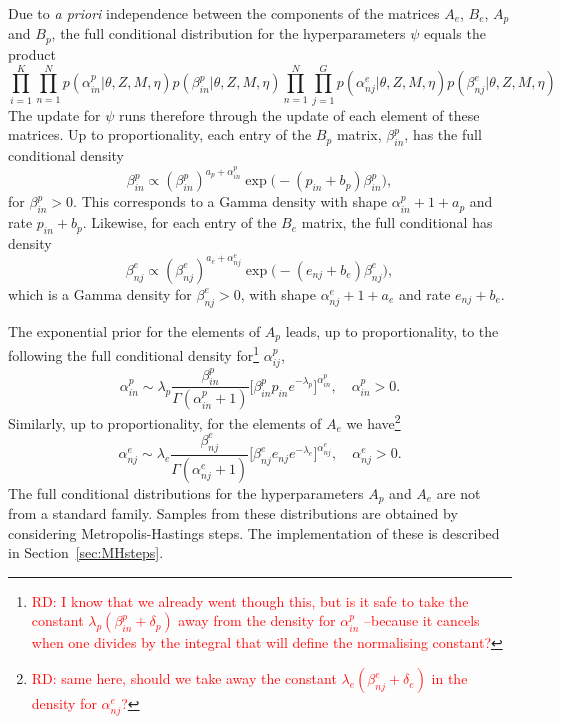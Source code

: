 \documentclass[11pt]{amsart}
\theoremstyle{definition}
\theoremstyle{remark}
\begin{document}
Due to \emph{a priori} independence between the
components of the matrices $A_e$, $B_e$, $A_p$ and $B_p$, the full conditional distribution for the hyperparameters $\psi$ equals the product
\[
   \prod_{i=1}^K\prod_{n=1}^N
     p(\alpha_{in}^p| \theta, Z, M, \eta)
     p(\beta_{in}^p|\theta, Z, M, \eta)
   \prod_{n=1}^N\prod_{j=1}^G
     p(\alpha_{nj}^e|\theta, Z, M, \eta)
     p(\beta_{nj}^e|\theta, Z, M, \eta)
\]
The update for $\psi$ runs therefore through the update of each
element of these matrices. Up to proportionality, each entry of the
$B_p$ matrix, $\beta_{in}^p$,  has the full conditional density
\begin{equation}
 \label{eqn:Full_for_Bp}
 \beta_{in}^p
   \propto
   (\beta_{in}^p)^{a_p + \alpha_{in}^p} 
   \exp\Big(-(p_{in}+b_p)\beta_{in}^p\Big),\tag{$s_4$}
\end{equation}
for $\beta_{in}^p > 0$. This corresponds to a Gamma density with shape
$\alpha_{in}^p + 1 + a_p$ and rate $p_{in} + b_p$.  Likewise, for each
entry of the $B_e$ matrix, the full conditional has density 
\begin{equation}
 \label{eqn:Full_for_Be}
 \beta_{nj}^e
   \propto
  (\beta_{nj}^e)^{a_e + \alpha_{nj}^e} 
  \exp\Big(-(e_{nj}+b_e)\beta_{nj}^e\Big),\tag{$s_5$}
\end{equation}
which is a  Gamma density for $\beta_{nj}^e > 0$, with shape
$\alpha_{nj}^e + 1+ a_e$ and rate $e_{nj}+b_e$. 


The exponential prior for the elements of $A_p$ leads, up to
proportionality, to the following the full conditional density
for\footnote{\textcolor{red}{RD: I know that we already went though
    this, but  is it safe to take the constant $\lambda_p(\beta_{in}^p
    + \delta_p)$ away from the density for $\alpha_{in}^p$ --because
    it  cancels when one divides by the integral that will define the
    normalising constant?}}
$\alpha_{ij}^p$,
\begin{equation}
 \label{eqn:Full_for_Ap}
  \alpha_{in}^p 
  \sim 
  \lambda_p\frac{\beta_{in}^p}{\Gamma(\alpha_{in}^p + 1)} 
   \Big[\beta_{in}^pp_{in}
   e^{-\lambda_p}\Big]^{\alpha_{in}^p}, \tag{$s_6$}
   \quad  \alpha_{in}^p > 0.
\end{equation}
Similarly, up to proportionality, for the elements of $A_e$ we
have\footnote{\textcolor{red}{RD: same here, should we take away the
    constant 
  $\lambda_e(\beta_{nj}^e + \delta_e)$ in the density for
  $\alpha_{nj}^e$?}}
\begin{equation}
 \label{eqn:Full_for_Ae}
  \alpha_{nj}^e 
  \sim
  \lambda_e\frac{\beta_{nj}^e}{\Gamma(\alpha_{nj}^e + 1)} 
   \Big[\beta_{nj}^e e_{nj}
   e^{-\lambda_e}\Big]^{\alpha_{nj}^e}, 
   \quad  \alpha_{nj}^e > 0. \tag{$s_7$}
\end{equation}
The full conditional distributions for the hyperparameters $A_p$ and
$A_e$ are not from a standard family. Samples from these distributions
are obtained by considering Metropolis-Hastings steps. The
implementation of these is described in Section~\ref{sec:MHsteps}.
\end{document}
